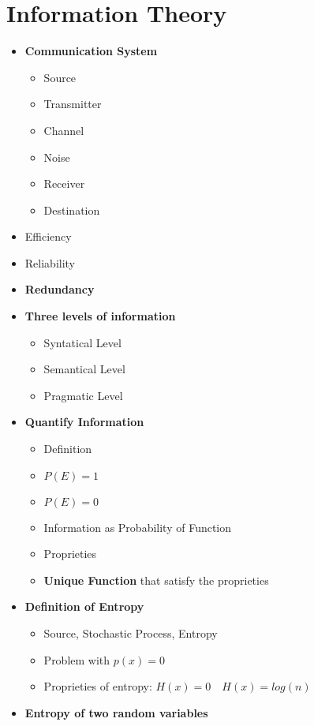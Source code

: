 \chapter{Information Theory}
\begin{itemize}
    \item \textbf{Communication System}
    \begin{itemize}
        \item Source
        \item Transmitter
        \item Channel
        \item Noise
        \item Receiver
        \item Destination
    \end{itemize}
    \item Efficiency
    \item Reliability
    \item \textbf{Redundancy}
    \item \textbf{Three levels of information}
    \begin{itemize}
        \item Syntatical Level
        \item Semantical Level
        \item Pragmatic Level
    \end{itemize}
    \item \textbf{Quantify Information}
    \begin{itemize}
        \item Definition
        \item \(P(E) = 1\)
        \item \(P(E) = 0\)
        \item Information as Probability of Function
        \item Proprieties
        \item \textbf{Unique Function} that satisfy the proprieties
    \end{itemize}
    \item \textbf{Definition of Entropy}
    \begin{itemize}
        \item Source, Stochastic Process, Entropy
        \item Problem with \(p(x) = 0\)
        \item Proprieties of entropy: \(H(x) = 0 \quad H(x) = log(n)\)
    \end{itemize}
    \item \textbf{Entropy of two random variables}

\end{itemize}

